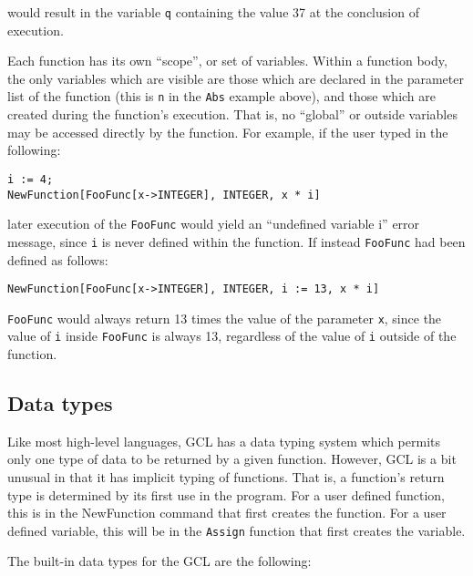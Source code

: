 \noindent would result in the variable \verb+q+ containing the value 37
at the conclusion of execution.

Each function has its own ``scope'', or set of variables.  Within a function
body, the only variables which are visible are those which are declared
in the parameter list of the function (this is \verb+n+ in the \verb+Abs+
example above), and those which are created during the function's execution.
That is, no ``global'' or outside variables may be accessed directly by the
function.  For example, if the user typed in the following:

\begin{verbatim}
i := 4;
NewFunction[FooFunc[x->INTEGER], INTEGER, x * i]
\end{verbatim}

\noindent later execution of the \verb+FooFunc+ would yield an ``undefined
variable i'' error message, since \verb+i+ is never defined within the
function.  If instead \verb+FooFunc+ had been defined as follows:

\begin{verbatim}
NewFunction[FooFunc[x->INTEGER], INTEGER, i := 13, x * i]
\end{verbatim}

\noindent \verb+FooFunc+ would always return 13 times the value of the
parameter \verb+x+, since the value of \verb+i+ inside \verb+FooFunc+ is
always 13, regardless of the value of \verb+i+ outside of the function.


\subsection{Data types}

Like most high-level languages, GCL has a data typing system which
permits only one type of data to be returned by a given function.
However, GCL is a bit unusual in that it has implicit typing of
functions.  That is, a function's return type is determined by its
first use in the program.  For a user defined function, this is in the
NewFunction command that first creates the function.  For a user
defined variable, this will be in the \verb+Assign+ function that
first creates the variable.

The built-in data types for the GCL are the following:  

\medskip

